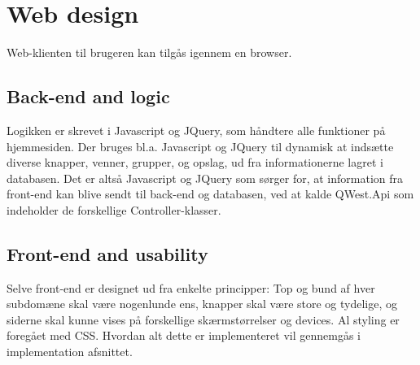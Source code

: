 \section{Web design}\label{sec:webdesign}
Web-klienten til brugeren kan tilgås igennem en browser. %
\subsection{Back-end and logic}\label{sec:backend}
Logikken er skrevet i Javascript og JQuery, som håndtere alle funktioner på hjemmesiden. Der bruges bl.a. Javascript og JQuery til dynamisk at indsætte diverse knapper, venner, grupper, og opslag, ud fra informationerne lagret i databasen. Det er altså Javascript og JQuery som sørger for, at information fra front-end kan blive sendt til back-end og databasen, ved at kalde QWest.Api som indeholder de forskellige Controller-klasser. %
\subsection{Front-end and usability}\label{sec:frontend}
Selve front-end er designet ud fra enkelte principper: Top og bund af hver subdomæne skal være nogenlunde ens, knapper skal være store og tydelige, og siderne skal kunne vises på forskellige skærmstørrelser og devices. Al styling er foregået med CSS. Hvordan alt dette er implementeret vil gennemgås i implementation afsnittet. %
